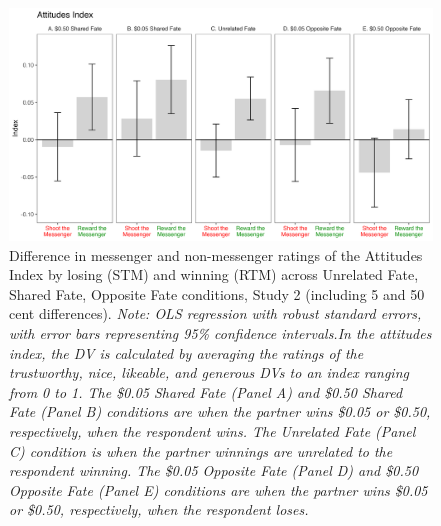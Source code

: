 \renewcommand{\baselinestretch}{1.25}%
\begin{figure}[!t]%
  \centering
  \includegraphics[width=1.0\textwidth]{figures/study2_main_fivecent_attitude_all.png}
  \caption{Difference in messenger and non-messenger ratings of the Attitudes Index by losing (STM) and winning (RTM) across Unrelated Fate, Shared Fate, Opposite Fate conditions, Study 2 (including 5 and 50 cent differences). 
  \textit{Note: OLS regression with robust standard errors, with error bars representing 95\% confidence intervals.In the attitudes index, the DV is calculated by averaging the ratings of the trustworthy, nice, likeable, and generous DVs to an index ranging from 0 to 1. The \$0.05 Shared Fate (Panel A) and \$0.50 Shared Fate (Panel B) conditions are when the partner wins \$0.05 or \$0.50, respectively, when the respondent wins. The Unrelated Fate (Panel C) condition is when the partner winnings are unrelated to the respondent winning. The \$0.05 Opposite Fate (Panel D) and \$0.50 Opposite Fate (Panel E) conditions are when the partner wins \$0.05 or \$0.50, respectively, when the respondent loses.}}
  \label{fig:study2_main_fivecent_attitude_all}
\end{figure}%
\renewcommand{\baselinestretch}{1.67}%
